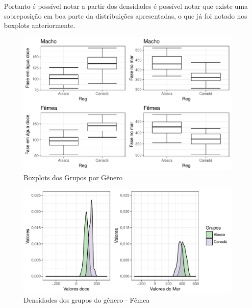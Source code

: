 \documentclass[10pt,portuguese,]{article}
\begin{document}
Portanto é possível notar a partir dos densidades é possível notar que
existe uma sobreposição em boa parte da distribuições apresentadas, o
que já foi notado nos boxplots anteriormente.

\begin{figure}[!h]

{\centering \includegraphics{RELATORIO_FINAL_FORMATADO_files/figure-latex/unnamed-chunk-33-1} 

}

\caption{Boxplots dos Grupos por Gênero}\label{fig:unnamed-chunk-33}
\end{figure}

\vspace{0.5cm}

\begin{figure}[!h]

{\centering \includegraphics{RELATORIO_FINAL_FORMATADO_files/figure-latex/unnamed-chunk-34-1} 

}

\caption{Densidades dos grupos do gênero -  Fêmea}\label{fig:unnamed-chunk-34}
\end{figure}
\end{document}
